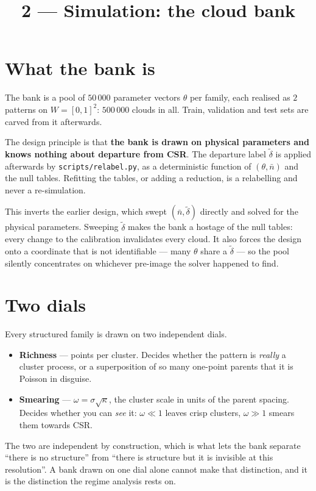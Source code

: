 \documentclass[11pt]{article}
\title{2 --- Simulation: the cloud bank}
\date{}
\newcommand{\dt}{\tilde\delta}
\newcommand{\nb}{\bar n}
\newcommand{\code}[1]{\texttt{#1}}
\begin{document}
\maketitle

\section{What the bank is}
The bank is a pool of $50\,000$ parameter vectors $\theta$ per family, each realised as $2$ patterns on $W=[0,1]^2$: $500\,000$ clouds in all. Train, validation and test sets are carved from it afterwards.

The design principle is that \textbf{the bank is drawn on physical parameters and knows nothing about departure from CSR}. The departure label $\dt$ is applied afterwards by \code{scripts/relabel.py}, as a deterministic function of $(\theta,\nb)$ and the null tables. Refitting the tables, or adding a reduction, is a relabelling and never a re-simulation.

This inverts the earlier design, which swept $(\nb,\dt)$ directly and solved for the physical parameters. Sweeping $\dt$ makes the bank a hostage of the null tables: every change to the calibration invalidates every cloud. It also forces the design onto a coordinate that is not identifiable --- many $\theta$ share a $\dt$ --- so the pool silently concentrates on whichever pre-image the solver happened to find.

\section{Two dials}
Every structured family is drawn on two independent dials.
\begin{itemize}
  \item \textbf{Richness} --- points per cluster. Decides whether the pattern is \emph{really} a cluster process, or a superposition of so many one-point parents that it is Poisson in disguise.
  \item \textbf{Smearing} --- $\omega = \sigma\sqrt{\kappa}$, the cluster scale in units of the parent spacing. Decides whether you can \emph{see} it: $\omega\ll1$ leaves crisp clusters, $\omega\gg1$ smears them towards CSR.
\end{itemize}
The two are independent by construction, which is what lets the bank separate ``there is no structure'' from ``there is structure but it is invisible at this resolution''. A bank drawn on one dial alone cannot make that distinction, and it is the distinction the regime analysis rests on.
\end{document}
